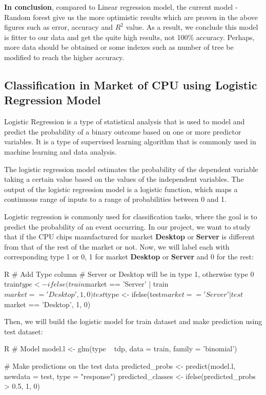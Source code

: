 \textbf{In conclusion}, compared to Linear regression model, the current model - Random forest give us the more optimistic results which are proven in the above figures such as error, accuracy and \(R^2\) value. As a result, we conclude this model is fitter to our data and get the quite high results, not 100\% accuracy. Perhaps, more data should be obtained or some indexes such as number of tree be modified to reach the higher accuracy.











\subsection{Classification in Market of CPU using Logistic Regression Model}
\label{section:data_analysis_logistic}
Logistic Regression is a type of statistical analysis that is used to model and predict the probability of a binary outcome based on one or more predictor variables. It is a type of supervised learning algorithm that is commonly used in machine learning and data analysis.

The logistic regression model estimates the probability of the dependent variable taking a certain value based on the values of the independent variables. The output of the logistic regression model is a logistic function, which maps a continuous range of inputs to a range of probabilities between 0 and 1.

Logistic regression is commonly used for classification tasks, where the goal is to predict the probability of an event occurring. In our project, we want to study that if the CPU chips manufactured for market \textbf{Desktop} or \textbf{Server} is different from that of the rest of the market or not. Now, we will label each with corresponding type 1 or 0, 1 for market \textbf{Desktop} or \textbf{Server} and 0 for the rest:
\begin{code}{R}
# Add Type column
# Server or Desktop will be in type 1, otherwise type 0
train$type <- ifelse(train$market == 'Server' | train$market == 'Desktop', 1, 0)
test$type <- ifelse(test$market == 'Server' | test$market == 'Desktop', 1, 0)
\end{code}

Then, we will build the logistic model for train dataset and make prediction using test dataset:
\begin{code}{R}
# Model
model.l <- glm(type ~ tdp, data = train, family = 'binomial')

# Make predictions on the test data
predicted_probs <- predict(model.l, newdata = test, type = "response")
predicted_classes <- ifelse(predicted_probs > 0.5, 1, 0)
\end{code}

